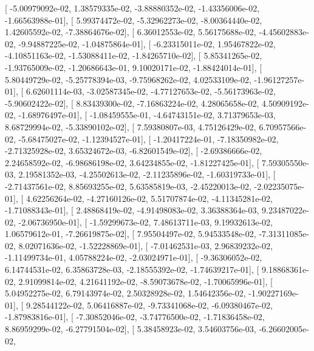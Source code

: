 \documentclass{article}
\begin{document}
       [ -5.00979092e-02,   1.38579335e-02,  -3.88880352e-02,
         -1.43356006e-02,  -1.66563988e-01],
       [  5.99374472e-02,  -5.32962273e-02,  -8.00364440e-02,
          1.42605592e-02,  -7.38864676e-02],
       [  6.36012553e-02,   5.56175688e-02,  -4.45602883e-02,
         -9.94887225e-02,  -1.04875864e-01],
       [ -6.23315011e-02,   1.95467822e-02,  -4.10851163e-02,
         -1.53088411e-02,  -1.84265710e-02],
       [  5.85341265e-02,  -1.93765009e-02,  -1.20686643e-01,
          9.10020171e-02,  -1.88424014e-01],
       [  5.80449729e-02,  -5.25778394e-03,  -9.75968262e-02,
          4.02533109e-02,  -1.96127257e-01],
       [  6.62601114e-03,  -3.02587345e-02,  -4.77127653e-02,
         -5.56173963e-02,  -5.90602422e-02],
       [  8.83439300e-02,  -7.16863224e-02,   4.28065658e-02,
          4.50909192e-02,  -1.68976497e-01],
       [ -1.08459555e-01,  -4.64743151e-02,   3.71379653e-03,
          8.68729994e-02,  -5.33890102e-02],
       [  7.59380807e-03,   4.75126429e-02,   6.70957566e-02,
         -5.68475027e-02,  -1.12394527e-01],
       [ -1.20417224e-01,  -7.18350982e-02,  -2.71325928e-02,
          3.65324672e-03,  -6.82601549e-02],
       [ -2.69386666e-02,   2.24658592e-02,  -6.98686198e-02,
          3.64234855e-02,  -1.81227425e-01],
       [  7.59305550e-03,   2.19581352e-03,  -4.25502613e-02,
         -2.11235896e-02,  -1.60319733e-01],
       [ -2.71437561e-02,   8.85693255e-02,   5.63585819e-03,
         -2.45220013e-02,  -2.02235075e-01],
       [  4.62256264e-02,  -4.27160126e-02,   5.51707874e-02,
         -4.11345281e-02,  -1.71088343e-01],
       [  2.48868419e-02,  -4.91498083e-02,   3.36388364e-03,
          9.23487022e-02,  -2.06736950e-01],
       [ -1.59299673e-02,   7.48613711e-03,   9.19932613e-02,
          1.06579612e-01,  -7.26619875e-02],
       [  7.95504497e-02,   5.94533548e-02,  -7.31311085e-02,
          8.02071636e-02,  -1.52228869e-01],
       [ -7.01462531e-03,   2.96839232e-02,  -1.11499734e-01,
          4.05788224e-02,  -2.03024971e-01],
       [ -9.36306052e-02,   6.14744531e-02,   6.35863728e-03,
         -2.18555392e-02,  -1.74639217e-01],
       [  9.18868361e-02,   2.91099814e-02,   4.21641192e-02,
         -8.59073678e-02,  -1.70065996e-01],
       [  5.04952275e-02,   6.79143974e-02,   2.50328928e-02,
          1.54642356e-02,  -1.90227169e-01],
       [  9.28544122e-02,   5.06416887e-02,  -9.73341068e-02,
         -6.09380467e-02,  -1.87983816e-01],
       [ -7.30852046e-02,  -3.74776500e-02,  -1.71836458e-02,
          8.86959299e-02,  -6.27791504e-02],
       [  5.38458923e-02,   3.54603756e-03,  -6.26602005e-02,
\end{document}
